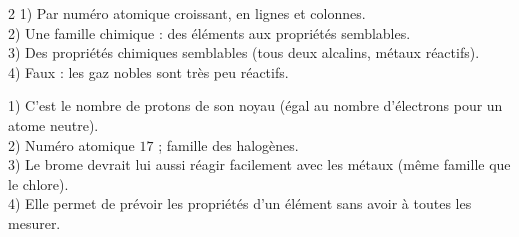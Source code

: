 \begin{multicols}{2}
1) Par numéro atomique croissant, en lignes et colonnes.\\
2) Une famille chimique : des éléments aux propriétés semblables.\\
3) Des propriétés chimiques semblables (tous deux alcalins, métaux réactifs).\\
4) Faux : les gaz nobles sont très peu réactifs.

1) C'est le nombre de protons de son noyau (égal au nombre d'électrons pour un atome
neutre).\\
2) Numéro atomique $17$ ; famille des halogènes.\\
3) Le brome devrait lui aussi réagir facilement avec les métaux (même famille que le
chlore).\\
4) Elle permet de prévoir les propriétés d'un élément sans avoir à toutes les mesurer.

\end{multicols}
\exercicesBanner
